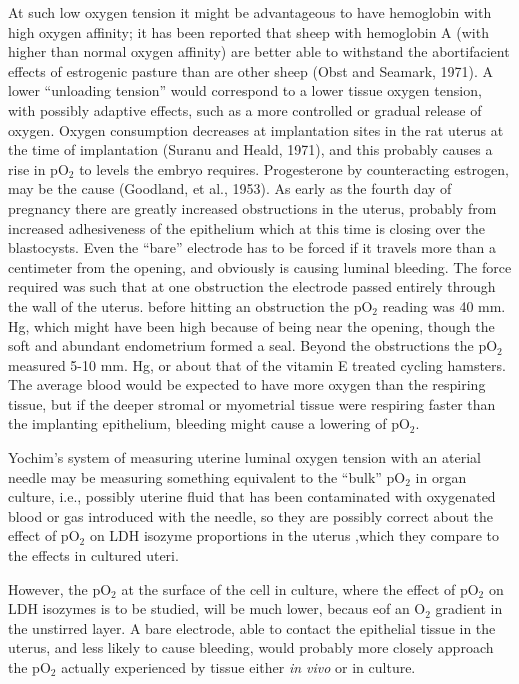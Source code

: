 At such low oxygen tension it might be advantageous to have hemoglobin with high oxygen affinity; it has been reported that sheep with hemoglobin A (with higher than normal oxygen affinity) are better able to withstand the abortifacient effects of estrogenic pasture than are other sheep (Obst and Seamark, 1971). A lower ``unloading tension'' would correspond to a lower tissue oxygen tension, with possibly adaptive effects, such as a more controlled or gradual release of oxygen. Oxygen consumption decreases at implantation sites in the rat uterus at the time of implantation (Suranu and Heald, 1971), and this probably causes a rise in pO$_{2}$ to levels the embryo requires. Progesterone by counteracting estrogen, may be the cause (Goodland, et al., 1953). As early as the fourth day of pregnancy there are greatly increased obstructions in the uterus, probably from increased adhesiveness of the epithelium which at this time is closing over the blastocysts. Even the ``bare'' electrode has to be forced if it travels more than a centimeter from the opening, and obviously is causing luminal bleeding. The force required was such that at one obstruction the electrode passed entirely through the wall of the uterus. before hitting an obstruction the pO$_{2}$ reading was 40 mm. Hg, which might have been high because of being near the opening, though the soft and abundant endometrium formed a seal. Beyond the obstructions the pO$_{2}$ measured 5-10 mm. Hg, or about that of the vitamin E treated cycling hamsters. The average blood would be expected to have more oxygen than the respiring tissue, but if the deeper stromal or myometrial tissue were respiring faster than the implanting epithelium, bleeding might cause a lowering of pO$_{2}$.

Yochim's system of measuring uterine luminal oxygen tension with an aterial needle may be measuring something equivalent to the ``bulk'' pO$_{2}$ in organ culture, i.e., possibly uterine fluid that has been contaminated with oxygenated blood or gas introduced with the needle, so they are possibly correct about the effect of pO$_{2}$ on LDH isozyme proportions in the uterus ,which they compare to the effects in cultured uteri.

However, the pO$_{2}$ at the surface of the cell in culture, where the effect of pO$_{2}$ on LDH isozymes is to be studied, will be much lower, becaus eof an O$_{2}$ gradient in the unstirred layer. A bare electrode, able to contact the epithelial tissue in the uterus, and less likely to cause bleeding, would probably more closely approach the pO$_{2}$ actually experienced by tissue either \textit{in vivo} or in culture.

